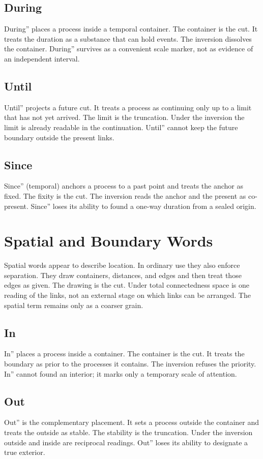 \documentclass[11pt,a4paper]{article}
\begin{document}
\subsection{During} During'' places a process inside a temporal container. The container is the cut. It treats the duration as a substance that can hold events. The inversion dissolves the container. During'' survives as a convenient scale marker, not as evidence of an independent interval.

\subsection{Until} Until'' projects a future cut. It treats a process as continuing only up to a limit that has not yet arrived. The limit is the truncation. Under the inversion the limit is already readable in the continuation. Until'' cannot keep the future boundary outside the present links.

\subsection{Since} Since'' (temporal) anchors a process to a past point and treats the anchor as fixed. The fixity is the cut. The inversion reads the anchor and the present as co-present. Since'' loses its ability to found a one-way duration from a sealed origin.

\section{Spatial and Boundary Words}

Spatial words appear to describe location. In ordinary use they also enforce separation. They draw containers, distances, and edges and then treat those edges as given. The drawing is the cut. Under total connectedness space is one reading of the links, not an external stage on which links can be arranged. The spatial term remains only as a coarser grain.

\subsection{In} In'' places a process inside a container. The container is the cut. It treats the boundary as prior to the processes it contains. The inversion refuses the priority. In'' cannot found an interior; it marks only a temporary scale of attention.

\subsection{Out} Out'' is the complementary placement. It sets a process outside the container and treats the outside as stable. The stability is the truncation. Under the inversion outside and inside are reciprocal readings. Out'' loses its ability to designate a true exterior.
\end{document}
